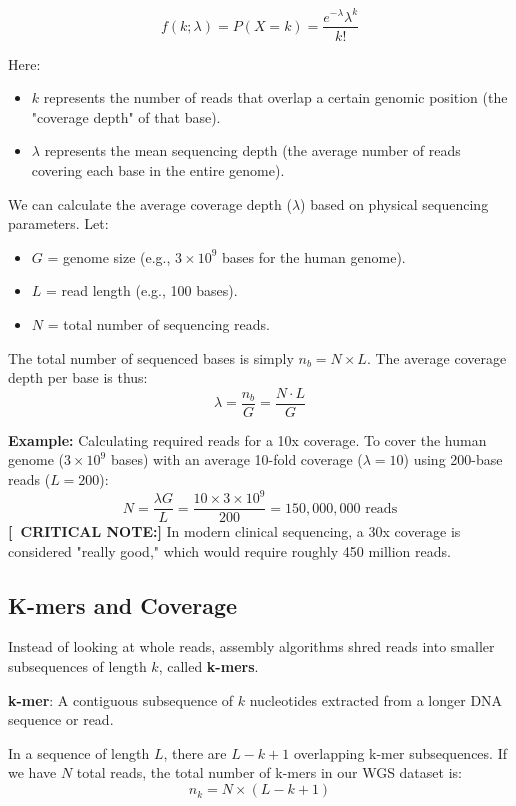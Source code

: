 \documentclass[11pt,a4paper]{article}
\newenvironment{important}{
    \vspace{1em}
    \begin{tcolorbox}[colback=blue!5!white, colframe=blue!75!black, boxrule=1pt, arc=4pt, left=10pt, right=10pt, top=10pt, bottom=10pt]
}{
    \end{tcolorbox}
    \vspace{1em}
}
\newcommand{\sta}{\textbf{[\textasteriskcentered\ CRITICAL NOTE:] }}
\begin{document}
\[ f(k; \lambda) = P(X = k) = \frac{e^{-\lambda} \lambda^k}{k!} \]

Here:
\begin{itemize}
    \item $k$ represents the number of reads that overlap a certain genomic position (the "coverage depth" of that base).
    \item $\lambda$ represents the mean sequencing depth (the average number of reads covering each base in the entire genome).
\end{itemize}

We can calculate the average coverage depth ($\lambda$) based on physical sequencing parameters. Let:
\begin{itemize}
    \item $G$ = genome size (e.g., $3 \times 10^9$ bases for the human genome).
    \item $L$ = read length (e.g., 100 bases).
    \item $N$ = total number of sequencing reads.
\end{itemize}

The total number of sequenced bases is simply $n_b = N \times L$. The average coverage depth per base is thus:
\[ \lambda = \frac{n_b}{G} = \frac{N \cdot L}{G} \]

\textbf{Example:} Calculating required reads for a 10x coverage.
To cover the human genome ($3 \times 10^9$ bases) with an average 10-fold coverage ($\lambda=10$) using 200-base reads ($L=200$):
\[ N = \frac{\lambda G}{L} = \frac{10 \times 3 \times 10^9}{200} = 150,000,000 \text{ reads} \]
\sta In modern clinical sequencing, a 30x coverage is considered "really good," which would require roughly 450 million reads.

\subsection{K-mers and Coverage}

Instead of looking at whole reads, assembly algorithms shred reads into smaller subsequences of length $k$, called \textbf{k-mers}.

\begin{important}
\textbf{k-mer}: A contiguous subsequence of $k$ nucleotides extracted from a longer DNA sequence or read.
\end{important}

In a sequence of length $L$, there are $L - k + 1$ overlapping k-mer subsequences. If we have $N$ total reads, the total number of k-mers in our WGS dataset is:
\[ n_k = N \times (L - k + 1) \]
\end{document}
